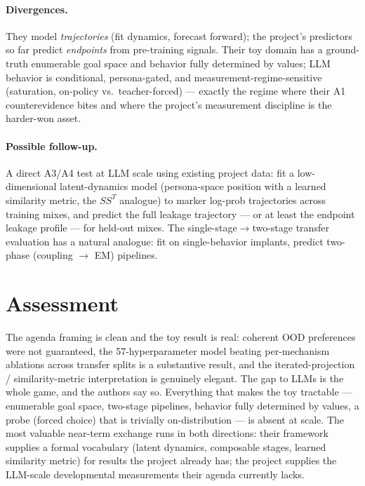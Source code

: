 \documentclass[11pt]{article}
\begin{document}
\paragraph{Divergences.} They model \emph{trajectories} (fit dynamics, forecast forward); the project's predictors so far predict \emph{endpoints} from pre-training signals. Their toy domain has a ground-truth enumerable goal space and behavior fully determined by values; LLM behavior is conditional, persona-gated, and measurement-regime-sensitive (saturation, on-policy vs.\ teacher-forced) --- exactly the regime where their A1 counterevidence bites and where the project's measurement discipline is the harder-won asset.

\paragraph{Possible follow-up.} A direct A3/A4 test at LLM scale using existing project data: fit a low-dimensional latent-dynamics model (persona-space position with a learned similarity metric, the $SS^{T}$ analogue) to marker log-prob trajectories across training mixes, and predict the full leakage trajectory --- or at least the endpoint leakage profile --- for held-out mixes. The single-stage$\to$two-stage transfer evaluation has a natural analogue: fit on single-behavior implants, predict two-phase (coupling $\to$ EM) pipelines.

\section{Assessment}
\label{sec:assessment}

The agenda framing is clean and the toy result is real: coherent OOD preferences were not guaranteed, the 57-hyperparameter model beating per-mechanism ablations across transfer splits is a substantive result, and the iterated-projection / similarity-metric interpretation is genuinely elegant. The gap to LLMs is the whole game, and the authors say so. Everything that makes the toy tractable --- enumerable goal space, two-stage pipelines, behavior fully determined by values, a probe (forced choice) that is trivially on-distribution --- is absent at scale. The most valuable near-term exchange runs in both directions: their framework supplies a formal vocabulary (latent dynamics, composable stages, learned similarity metric) for results the project already has; the project supplies the LLM-scale developmental measurements their agenda currently lacks.
\end{document}

